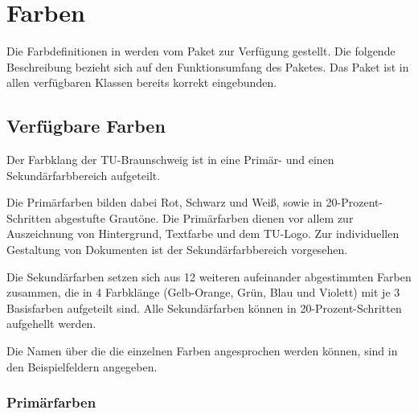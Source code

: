 \chapter{Farben}

\newcommand{\classoptionitem}[1][ ]{
  \item[\mdseries{\ttfamily%
    \textbackslash usepackage%
    {[{\color{tuRed}#1}]}%
    \{tubslogo\}}]\hfill\\
}

Die Farbdefinitionen in \tubslatex werden vom Paket 
zur Verfügung gestellt. Die folgende Beschreibung bezieht sich
auf den Funktionsumfang des Paketes. Das Paket ist in allen verfügbaren
Klassen bereits korrekt eingebunden.

\newcommand{\rainbow}[2][\relax]{{\noindent\sffamily\footnotesize%
\ifx#1\relax\colorlet{fglbg}{black}\else\colorlet{fglbg}{#1}\fi
\colorbox{#2100}{\hbox to 0.188\textwidth{%
  \color{fglbg}\vphantom{Fg}#2{}100\hfill}}%
\colorbox{#280}{\hbox to 0.188\textwidth{%
  \color{fglbg}\vphantom{Fg}#2{}80\hfill}}%
\colorbox{#260}{\hbox to 0.188\textwidth{\vphantom{Fg}#2{}60\hfill}}%
\colorbox{#240}{\hbox to 0.188\textwidth{\vphantom{Fg}#2{}40\hfill}}%
\colorbox{#220}{\hbox to 0.188\textwidth{\vphantom{Fg}#2{}20\hfill}}\\%
}}

\section{Verfügbare Farben}

Der Farbklang der TU-Braunschweig ist in eine Primär- und einen
Sekundärfarbbereich aufgeteilt.

Die Primärfarben bilden dabei Rot, Schwarz und Weiß, sowie in
20-Prozent-Schritten abgestufte Grautöne. Die Primärfarben dienen
vor allem zur Auszeichnung von Hintergrund, Textfarbe und dem TU-Logo.
Zur individuellen Gestaltung von Dokumenten ist der Sekundärfarbbereich
vorgesehen.

Die Sekundärfarben setzen sich aus 12 weiteren aufeinander abgestimmten
Farben zusammen, die 
in 4 Farbklänge (Gelb-Orange, Grün, Blau und Violett) mit je 3 Basisfarben
aufgeteilt sind.
Alle Sekundärfarben können in 20-Prozent-Schritten aufgehellt werden.

Die Namen über die die einzelnen Farben angesprochen werden können, sind in den
Beispielfeldern angegeben.

\subsection{Primärfarben}

